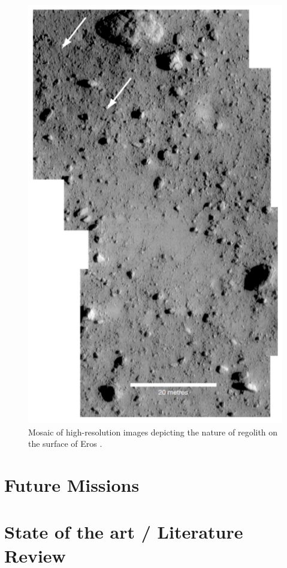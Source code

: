 \begin{figure}[htb]
\centering
\captionsetup{justification=centering}
\includegraphics[width=\linewidth, height=0.5\textheight, keepaspectratio=true]{eros_regolith.pdf}
\caption{Mosaic of high-resolution images depicting the nature of regolith on the surface of Eros \parencite{veverka2001landing}.}
\label{fig:eros_regolith}
\end{figure}
\FloatBarrier

\section{Future Missions}
\label{sec:future_missions}


\section{State of the art / Literature Review}
\label{sec:literature_review}
